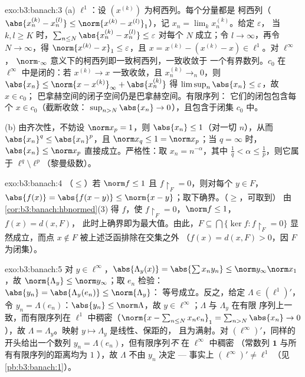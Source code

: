 \begin{solution}{exo:b3:banach:3}
(a) $\ell^1$：设 $(x^{(k)})$ 为柯西列。每个分量都是
柯西列（$\abs{x^{(k)}_n - x^{(l)}_n} \leq \norm{x^{(k)} -
x^{(l)}}_1$），记 $x_n = \lim_kx^{(k)}_n$。给定 $\varepsilon$，
当 $k, l \geq K$ 时，$\sum_{n \leq N}\abs{x^{(k)}_n - x^{(l)}_n}
\leq \varepsilon$ 对每个 $N$ 成立；令 $l \to \infty$，再令 $N \to
\infty$，得 $\norm{x^{(k)} - x}_1 \leq \varepsilon$，且 $x =
x^{(k)} - (x^{(k)} - x) \in \ell^1$。对 $\ell^\infty$，
$\norm\cdot_\infty$ 意义下的柯西列即一致柯西列，一致收敛于
一个有界数列。$c_0$ 在 $\ell^\infty$ 中是闭的：若
$x^{(k)} \to x$ 一致收敛，且 $x^{(k)}_n \to_n 0$，则
$\abs{x_n} \leq \norm{x - x^{(k)}}_\infty + \abs{x^{(k)}_n}$
得 $\limsup_n\abs{x_n} \leq \varepsilon$，故 $x \in c_0$；
巴拿赫空间的闭子空间仍是巴拿赫空间。有限序列：
它们的闭包包含每个 $x \in c_0$（截断收敛：
$\sup_{n>N}\abs{x_n} \to 0$），且包含于闭集
$c_0$ 中。

(b) 由齐次性，不妨设 $\norm x_p = 1$，则 $\abs{x_n} \leq
1$（对一切 $n$），从而 $\abs{x_n}^q \leq \abs{x_n}^p$，且 $\norm
x_q \leq 1 = \norm x_p$；当 $q = \infty$ 时，$\abs{x_n} \leq
\norm x_p$ 直接成立。严格性：取 $x_n = n^{-\alpha}$，其中
$\frac1q < \alpha \leq \frac1p$，则它属于 $\ell^q \setminus
\ell^p$（黎曼级数）。
\end{solution}

\begin{solution}{exo:b3:banach:4}
（$\leq$）若 $\norm f \leq 1$ 且 $f\restriction_F = 0$，则对每个 $y \in F$，
$\abs{f(x)} = \abs{f(x - y)} \leq \norm{x -
y}$；取下确界。（$\geq$，可取到）
由\cref{cor:b3:banach:hbnormed}(3) 得 $f$，使
$f\restriction_F = 0$，$\norm f \leq 1$，$f(x) = d(x, F)$，
此时上确界即为最大值。由此，$F \subseteq \bigcap\{\ker
f : f\restriction_F = 0\}$ 显然成立，而点 $x \notin F$
被上述泛函排除在交集之外
（$f(x) = d(x,F) > 0$，因 $F$ 为闭集）。
\end{solution}

\begin{solution}{exo:b3:banach:5}
对 $y \in \ell^\infty$，$\abs{\Lambda_y(x)} =
\abs{\sum x_ny_n} \leq \norm y_\infty\norm x_1$，故
$\norm{\Lambda_y} \leq \norm y_\infty$；取 $e_n$ 检验：
$\abs{y_n} = \abs{\Lambda_y(e_n)} \leq \norm{\Lambda_y}$：
等号成立。反之，给定 $\Lambda \in (\ell^1)'$，令 $y_n =
\Lambda(e_n)$：$\abs{y_n} \leq \norm\Lambda$，故 $y \in
\ell^\infty$；$\Lambda$ 与 $\Lambda_y$ 在有限
序列上一致，而有限序列在 $\ell^1$ 中稠密（$\norm{x - \sum_{n\leq
N}x_ne_n}_1 = \sum_{n>N}\abs{x_n} \to 0$），故 $\Lambda =
\Lambda_y$。映射 $y \mapsto \Lambda_y$ 是线性、保距的，
且为满射。对 $(\ell^\infty)'$，同样的开头给出一个数列
$y_n = \Lambda(e_n)$，但有限序列\emph{不}
在 $\ell^\infty$ 中稠密
（常数列 $\mathbf 1$ 与所有有限序列的距离均为 $1$
），故 $\Lambda$ 不由 $y_n$ 决定 ---
事实上 $(\ell^\infty)' \neq \ell^1$
（见\cref{pb:b3:banach:1}）。
\end{solution}

